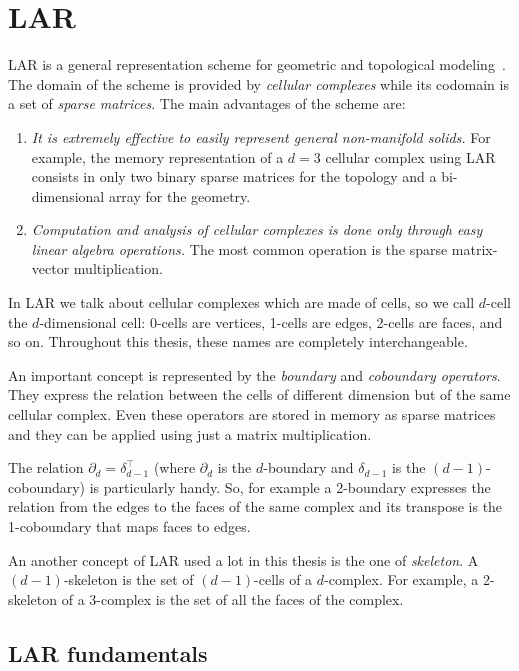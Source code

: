 \chapter{LAR}
\label{sec:LAR}

LAR is a general representation scheme for geometric and topological
modeling~\cite{Dicarlo:2014:TNL:2543138.2543294}. 
The domain of the scheme is provided by \textit{cellular complexes}
while its codomain is a set of \textit{sparse matrices}.
The main advantages of the scheme are:
\begin{enumerate}
    \item
    \textit{It is extremely effective to easily represent general non-manifold solids.}
    For example, the memory representation of a $d=3$ cellular complex using LAR 
    consists in only two binary sparse matrices for the topology and a bi-dimensional
    array for the geometry.
    \item
    \textit{Computation and analysis of cellular complexes is
    done only through easy linear algebra operations.} 
    The most common operation is the sparse matrix-vector 
    multiplication.
\end{enumerate}

In LAR we talk about cellular complexes which are made of cells, so we
call $d$-cell the $d$-dimensional cell: 0-cells are vertices,
1-cells are edges, 2-cells are faces, and so on.
Throughout this thesis, these names are completely
interchangeable.

An important concept is represented by the \textit{boundary} and 
\textit{coboundary operators}. They express the relation
between the cells of different dimension but of the same cellular complex.
Even these operators are stored in memory as sparse matrices 
and they can be applied using just a matrix multiplication.

The relation $\partial_d = \delta_{d-1}^\top$ (where $\partial_d$ 
is the $d$-boundary and $\delta_{d-1}$ is the $(d-1)$-coboundary)
is particularly handy. So, for example a 2-boundary expresses 
the relation from the edges to the faces of the same complex and
its transpose is the 1-coboundary that maps faces to edges.

An another concept of LAR used a lot in this thesis is the one of
\textit{skeleton}. A $(d-1)$-skeleton is the set of $(d-1)$-cells of
a $d$-complex. For example, a 2-skeleton of a 3-complex is the set
of all the faces of the complex.

\section{LAR fundamentals}
\label{sec:fundamentals}

